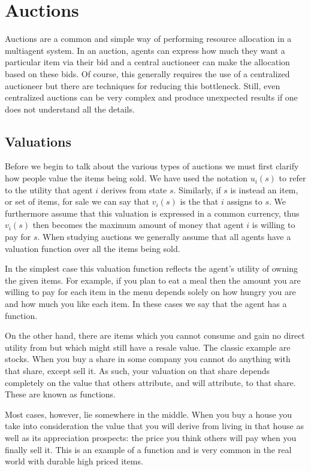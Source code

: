 \chapter{Auctions}
\label{ch:auctions}

Auctions are a common and simple way of performing resource allocation
in a multiagent system. In an auction, agents can express how much
they want a particular item via their bid and a central auctioneer can
make the allocation based on these bids. Of course, this generally
requires the use of a centralized auctioneer but there are techniques
for reducing this bottleneck. Still, even centralized auctions can be
very complex and produce unexpected results if one does not understand
all the details.

\section{Valuations}
\label{sec:valuations}

Before we begin to talk about the various types of auctions we must
first clarify how people value the items being sold. We have used the
notation $u_i(s)$ to refer to the utility that agent $i$ derives from
state $s$. Similarly, if $s$ is instead an item, or set of items, for
sale we can say that $v_i(s)$ is the  that $i$ assigns
to $s$.  We furthermore assume that this valuation is expressed in a
common currency, thus $v_i(s)$ then becomes the maximum amount of
money that agent $i$ is willing to pay for $s$. When studying auctions
we generally assume that all agents have a valuation function over all
the items being sold.

In the simplest case this valuation function reflects the agent's
utility of owning the given items. For example, if you plan to eat a
meal then the amount you are willing to pay for each item in the menu
depends solely on how hungry you are and how much you like each item.
In these cases we say that the agent has a 
function.

On the other hand, there are items which you cannot consume and gain
no direct utility from but which might still have a resale value. The
classic example are stocks. When you buy a share in some company you
cannot do anything with that share, except sell it. As such, your
valuation on that share depends completely on the value that others
attribute, and will attribute, to that share. These are known as
 functions.

Most cases, however, lie somewhere in the middle. When you buy a house
you take into consideration the value that you will derive from living
in that house as well as its appreciation prospects: the price you
think others will pay when you finally sell it. This is an example of
a  function and is very common in the real world
with durable high priced items.

